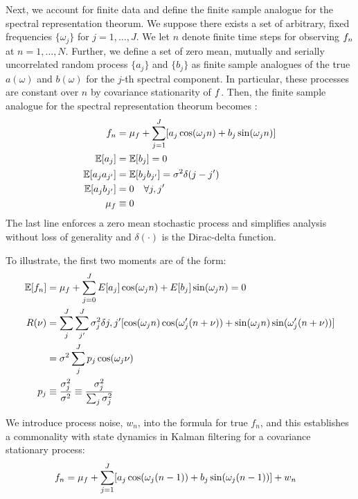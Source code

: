 Next, we account for finite data and define the finite sample analogue for the spectral representation theorum. We suppose there exists a set of arbitrary, fixed frequencies  $\{\omega_j\}$  for $j = 1, \hdots , J$. We let $n$ denote finite time steps for observing $f_n$ at $n= 1, \hdots, N$. Further, we define a set of zero mean, mutually and serially uncorrelated random process  $\{a_j \}$ and $\{b_j\}$ as finite sample analogues of the true  $a(\omega)$ and $b(\omega)$ for the $j$-th spectral component. In particular, these processes are constant over $n$ by covariance stationarity of $f$. Then, the finite sample analogue for the spectral representation theorum becomes \cite{hamilton1994time}:
\begin{align} 
f_n &= \mu_f  + \sum_{j=1}^{J}  [ a_j \cos(\omega_j n) +  b_j \sin(\omega_j n) ] \\
\mathbb{E}[a_j] & = \mathbb{E}[b_j] = 0\\
\mathbb{E}[a_ja_{j'}] &= \mathbb{E}[b_jb_{j'}] = \sigma^2 \delta(j - j') \\
\mathbb{E}[a_jb_{j'}] &= 0 \quad \forall j, j' \\
\mu_f &\equiv 0 
\end{align} The last line enforces a zero mean stochastic process and simplifies analysis without loss of generality  and  $\delta(\cdot)$ is the Dirac-delta function. 

To illustrate, the first two moments are of the form:
\begin{align}
\mathbb{E}[f_n] &=  \mu_f +  \sum_{j=0}^{J} E[a_j] \cos(\omega_j n) + E[b_j] \sin(\omega_j n)  = 0\\
R(\nu) &= \sum_j^{J} \sum_{j'}^{J} \sigma_j^2\delta{j,j'} [\cos(\omega_j n)\cos(\omega_j' (n+\nu)) + \sin(\omega_j n)\sin(\omega_j' (n+\nu)) ]\\
&= \sigma^2 \sum_j^{J}  p_j \cos(\omega_j\nu) \label{eqn:app:spectral:Rvtrue} \\
p_j & \equiv \frac{\sigma_j^2}{\sigma^2} \equiv \frac{\sigma_j^2}{\sum_j \sigma_j^2} 
\end{align}

We introduce process noise, $w_n$, into the formula for true $f_n$, and this establishes a commonality with state dynamics in Kalman filtering for a covariance stationary process:
\begin{align} 
f_n &= \mu_f  + \sum_{j=1}^{J}  [ a_j \cos(\omega_j (n-1)) +  b_j \sin(\omega_j (n-1)) ] + w_n 
\end{align}

